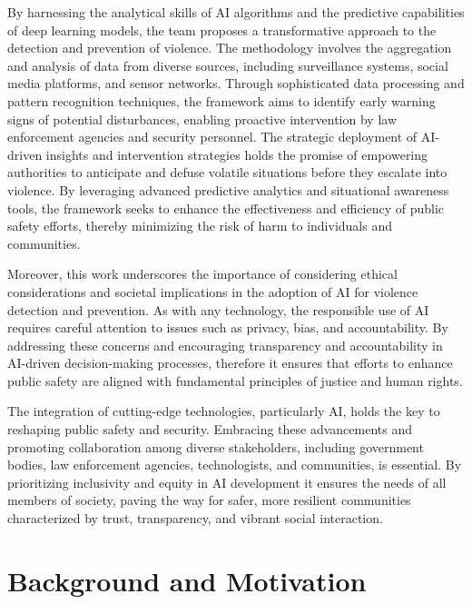 \noindent By harnessing the analytical skills of AI algorithms and the predictive capabilities of deep learning models, the team proposes a transformative approach to the detection and prevention of violence. The methodology involves the aggregation and analysis of data from diverse sources, including surveillance systems, social media platforms, and sensor networks. Through sophisticated data processing and pattern recognition techniques, the framework aims to identify early warning signs of potential disturbances, enabling proactive intervention by law enforcement agencies and security personnel. The strategic deployment of AI-driven insights and intervention strategies holds the promise of empowering authorities to anticipate and defuse volatile situations before they escalate into violence. By leveraging advanced predictive analytics and situational awareness tools, the framework seeks to enhance the effectiveness and efficiency of public safety efforts, thereby minimizing the risk of harm to individuals and communities.

\noindent Moreover, this work underscores the importance of considering ethical considerations and societal implications in the adoption of AI for violence detection and prevention\cite{crowd_viol}. As with any technology, the responsible use of AI requires careful attention to issues such as privacy, bias, and accountability. By addressing these concerns and encouraging transparency and accountability in AI-driven decision-making processes, therefore it ensures that efforts to enhance public safety are aligned with fundamental principles of justice and human rights.

\clearpage

\noindent The integration of cutting-edge technologies, particularly AI, holds the key to reshaping public safety and security. Embracing these advancements and promoting collaboration among diverse stakeholders, including government bodies, law enforcement agencies, technologists, and communities, is essential. By prioritizing inclusivity and equity in AI development it ensures the needs of all members of society, paving the way for safer, more resilient communities characterized by trust, transparency, and vibrant social interaction.


\setlength{\parskip}{2ex}

\section{Background and Motivation}


